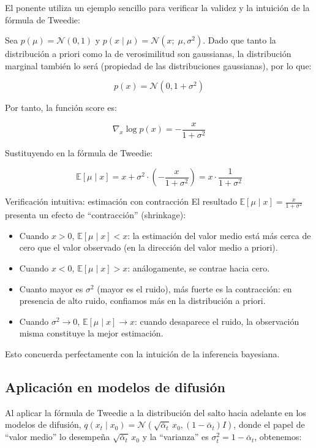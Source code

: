 \documentclass[a4paper]{article}
\begin{document}
El ponente utiliza un ejemplo sencillo para verificar la validez y la intuición de la fórmula de Tweedie:

Sea $p(\mu) = \mathcal{N}(0, 1)$ y $p(x \mid \mu) = \mathcal{N}(x;\; \mu, \sigma^2)$. Dado que tanto la distribución a priori como la de verosimilitud son gaussianas, la distribución marginal también lo será (propiedad de las distribuciones gaussianas), por lo que:

$$p(x) = \mathcal{N}(0, 1 + \sigma^2)$$

Por tanto, la función score es:

$$\nabla_x \log p(x) = -\frac{x}{1 + \sigma^2}$$

Sustituyendo en la fórmula de Tweedie:

$$\mathbb{E}[\mu \mid x] = x + \sigma^2 \cdot \left(-\frac{x}{1+\sigma^2}\right) = x \cdot \frac{1}{1+\sigma^2}$$

\begin{knowledgebox}{Verificación intuitiva: estimación con contracción}
El resultado $\mathbb{E}[\mu \mid x] = \frac{x}{1+\sigma^2}$ presenta un efecto de ``contracción'' (shrinkage):
\begin{itemize}
    \item Cuando $x > 0$, $\mathbb{E}[\mu \mid x] < x$: la estimación del valor medio está más cerca de cero que el valor observado (en la dirección del valor medio a priori).
    \item Cuando $x < 0$, $\mathbb{E}[\mu \mid x] > x$: análogamente, se contrae hacia cero.
    \item Cuanto mayor es $\sigma^2$ (mayor es el ruido), más fuerte es la contracción: en presencia de alto ruido, confiamos más en la distribución a priori.
    \item Cuando $\sigma^2 \to 0$, $\mathbb{E}[\mu \mid x] \to x$: cuando desaparece el ruido, la observación misma constituye la mejor estimación.
\end{itemize}
Esto concuerda perfectamente con la intuición de la inferencia bayesiana.
\end{knowledgebox}

\subsection{Aplicación en modelos de difusión}

Al aplicar la fórmula de Tweedie a la distribución del salto hacia adelante en los modelos de difusión, $q(x_t \mid x_0) = \mathcal{N}(\sqrt{\bar{\alpha}_t}\, x_0, (1-\bar{\alpha}_t)I)$, donde el papel de ``valor medio'' lo desempeña $\sqrt{\bar{\alpha}_t}\, x_0$ y la ``varianza'' es $\sigma_t^2 = 1-\bar{\alpha}_t$, obtenemos:
\end{document}

